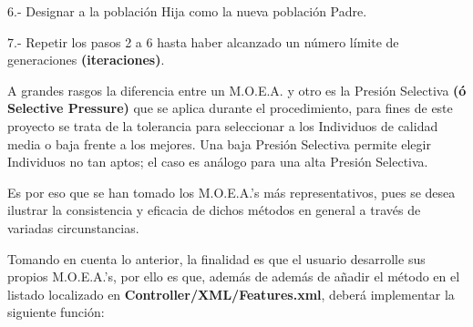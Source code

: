 \documentclass[letterpaper,10pt,english]{sphinxmanual}
\begin{document}
\begin{DUlineblock}{0em}
\item[] 6.- Designar a la población Hija como la nueva población Padre.
\end{DUlineblock}

\begin{DUlineblock}{0em}
\item[] 7.- Repetir los pasos 2 a 6 hasta haber alcanzado un número límite de generaciones \textbf{(iteraciones)}.
\item[] 
\item[] A grandes rasgos la diferencia entre un M.O.E.A. y otro es la Presión Selectiva
\textbf{(ó Selective Pressure)} que se aplica durante el procedimiento, para fines de este proyecto
se trata de la tolerancia para seleccionar a los Individuos de calidad media o baja frente a los
mejores. Una baja Presión Selectiva permite elegir Individuos no tan aptos; el caso es análogo para
una alta Presión Selectiva.
\item[] Es por eso que se han tomado los M.O.E.A.'s más representativos, pues se desea ilustrar la
consistencia y eficacia de dichos métodos en general a través de variadas circunstancias.
\item[] 
\item[] Tomando en cuenta lo anterior, la finalidad es que el usuario desarrolle
sus propios M.O.E.A.'s, por ello es que, además de  además de añadir
el método en el listado localizado en \textbf{Controller/XML/Features.xml}, deberá implementar la siguiente función:
\end{DUlineblock}
\end{document}
